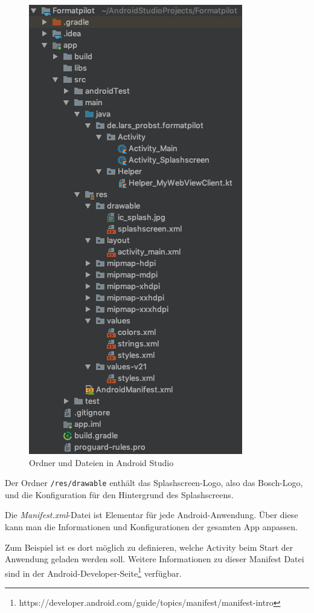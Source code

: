 \begin{figure}[h]
    \centering
    \includegraphics[scale=0.3]{images/kapitel_4/android_folder.png}
    \caption{Ordner und Dateien in Android Studio}
    \label{fig:umsetzung_android_folder}
\end{figure}

Der Ordner \texttt{/res/drawable} enthält das Splashscreen-Logo, also das Bosch-Logo, und die Konfiguration für den
Hintergrund des Splashscreens.

Die \textit{Manifest.xml}-Datei ist Elementar für jede Android-Anwendung. Über diese kann man die Informationen und
Konfigurationen der gesamten App anpassen.

Zum Beispiel ist es dort möglich zu definieren, welche Activity beim Start der Anwendung geladen werden soll. Weitere
Informationen zu dieser Manifest Datei sind in der
Android-Developer-Seite\footnote{https://developer.android.com/guide/topics/manifest/manifest-intro} verfügbar.

